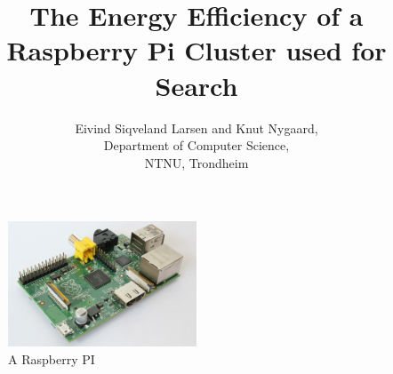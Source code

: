 \documentclass[a4paper, 12pt]{article}
\title{The Energy Efficiency of a Raspberry Pi Cluster used for Search}
\author{Eivind Siqveland Larsen and Knut Nygaard,\\
        Department of Computer Science,\\
        NTNU,
        Trondheim}
\begin{document}
\maketitle



\begin{figure}
    \centering
    \includegraphics[width=0.5\textwidth]{hardware/RaspberryPi}
    \caption{A Raspberry PI}
    \label{fig:raspberrypi_hw}
\end{figure}

\clearpage
\tableofcontents











\clearpage


\end{document}
